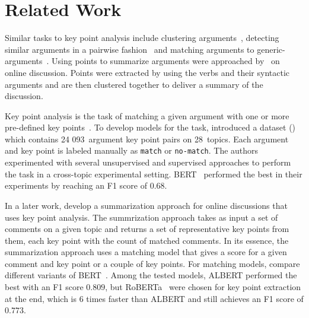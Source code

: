 \section{Related Work}\label{related-work}





Similar tasks to key point analysis include clustering arguments~\cite{reimers2019classification,ajjour2019modeling}, detecting similar arguments in a pairwise fashion~\cite{misra:2016} and matching arguments to generic-arguments~\cite{naderi:2017}. Using points to summarize arguments were approached by~\citet{egan2016summarising} on online discussion. Points were extracted by using the verbs and their syntactic arguments and are then clustered together to deliver a summary of the discussion. 

Key point analysis is the task of matching a given argument with one or more pre-defined key points~\cite{Bar-HaimEFKLS2020}. To develop models for the task, \citet{Bar-HaimEFKLS2020} introduced a dataset (\ArgKP) which contains 24 093~argument key point pairs on 28~topics. Each argument and key point is labeled manually as \texttt{match} or \texttt{no-match}. The authors experimented with several unsupervised and supervised approaches to perform the task in a cross-topic experimental setting. BERT~\cite{DevlinCLT2019} performed the best in their experiments by reaching an F1 score of $0.68$.

In a later work, \citet{Bar-HaimKEFLS2020} develop a summarization approach for online discussions that
uses key point analysis. The summrization approach takes as input a set of comments on a given topic and returns a set of representative key points from them, each key point with the count of matched comments. In its essence, the summarization approach uses a matching model that gives a score for a given comment and key point or a couple of key points. For matching models, \citet{Bar-HaimKEFLS2020} compare different variants of BERT~\cite{DevlinCLT2019}. Among the tested models, ALBERT \cite{lan2019albert} performed the best with an F1 score $0.809$, but RoBERTa~\cite{LiuOGDJCLLZS2019} were chosen for key point extraction at the end, which is 6 times faster than ALBERT and still achieves an F1 score of $0.773$. 

